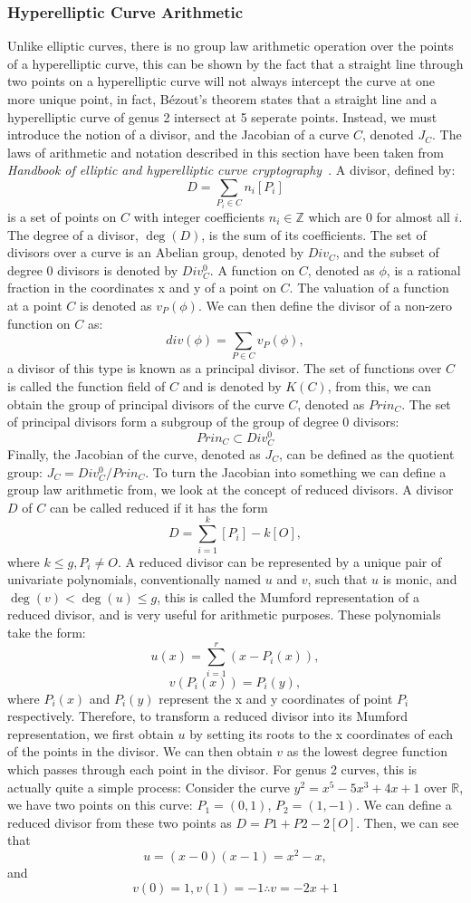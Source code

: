 \subsubsection{Hyperelliptic Curve Arithmetic}
Unlike elliptic curves, there is no group law arithmetic operation over the points of a hyperelliptic curve, this can be shown by the fact that a straight line through two points on a hyperelliptic curve will not always intercept the curve at one more unique point, in fact, Bézout's theorem states that a straight line and a hyperelliptic curve of genus 2 intersect at 5 seperate points. Instead, we must introduce the notion of a divisor, and the Jacobian of a curve $C$, denoted $J_C$. The laws of arithmetic and notation described in this section have been taken from \emph{Handbook of elliptic and hyperelliptic curve cryptography}~\cite{cohen2005handbook}. A divisor, defined by: $$D = \sum_{P_i\in{C}}n_i[P_i]$$ is a set of points on $C$ with integer coefficients $n_i \in \mathbb{Z}$ which are 0 for almost all $i$. The degree of a divisor, $\deg(D)$, is the sum of its coefficients. The set of divisors over a curve is an Abelian group, denoted by $Div_C $, and the subset of degree 0 divisors is denoted by $Div^0_C$. A function on $C$, denoted as $\phi$, is a rational fraction in the coordinates x and y of a point on $C$. The valuation of a function at a point $C$ is denoted as $v_P(\phi)$. We can then define the divisor of a non-zero function on $C$ as: $$div(\phi)=\sum_{P\in{C}}v_P(\phi),$$ a divisor of this type is known as a principal divisor. The set of functions over $C$ is called the function field of $C$ and is denoted by $K(C)$, from this, we can obtain the group of principal divisors of the curve $C$, denoted as $Prin_C$. The set of principal divisors form a subgroup of the group of degree 0 divisors: $$Prin_C \subset Div^0_C$$ Finally, the Jacobian of the curve, denoted as $J_C$, can be defined as the quotient group: $J_C = Div^0_C/Prin_C$. To turn the Jacobian into something we can define a group law arithmetic from, we look at the concept of reduced divisors. A divisor $D$ of $C$ can be called reduced if it has the form $$D = \sum^k_{i=1}[P_i]-k[\textit{O}],$$ where $k \leq g, P_i \neq \textit{O}$. A reduced divisor can be represented by a unique pair of univariate polynomials, conventionally named $u$ and $v$, such that $u$ is monic, and $\deg(v)<\deg(u)\leq g$, this is called the Mumford representation of a reduced divisor, and is very useful for arithmetic purposes. These polynomials take the form: $$u(x) = \sum_{i=1}^r (x-P_i(x)),$$ $$v(P_i(x)) = P_i(y),$$ where $P_i(x)$ and $P_i(y)$ represent the x and y coordinates of point $P_i$ respectively. Therefore, to transform a reduced divisor into its Mumford representation, we first obtain $u$ by setting its roots to the x coordinates of each of the points in the divisor. We can then obtain $v$ as the lowest degree function which passes through each point in the divisor. For genus 2 curves, this is actually quite a simple process: Consider the curve $y^2 = x^5-5x^3+4x+1$ over $\mathbb{R}$, we have two points on this curve: $P_1 = (0,1)$, $P_2 = (1,-1)$. We can define a reduced divisor from these two points as $D = P1 + P2 - 2[\textit{O}]$. Then, we can see that $$u = (x-0)(x-1) = x^2-x,$$ and $$v(0) = 1, v(1) = -1 \therefore v = -2x+1$$
